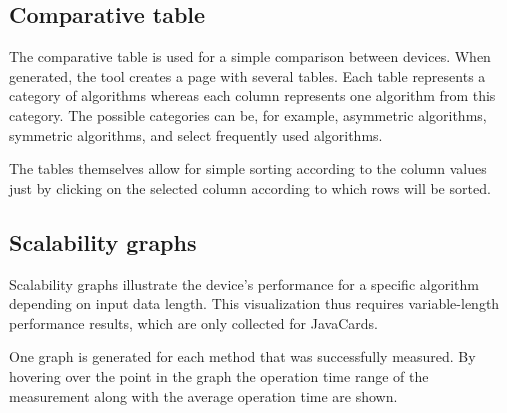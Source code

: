 
\subsection{Comparative table}
The comparative table is used for a simple comparison between devices. When generated, the tool creates a page with several tables. Each table represents a category of algorithms whereas each column represents one algorithm from this category. The possible categories can be, for example, asymmetric algorithms, symmetric algorithms, and select frequently used algorithms.

The tables themselves allow for simple sorting according to the column values just by clicking on the selected column according to which rows will be sorted.


\subsection{Scalability graphs}
Scalability graphs illustrate the device's performance for a specific algorithm depending on input data length. This visualization thus requires variable-length performance results, which are only collected for JavaCards.

One graph is generated for each method that was successfully measured. By hovering over the point in the graph the operation time range of the measurement along with the average operation time are shown.





